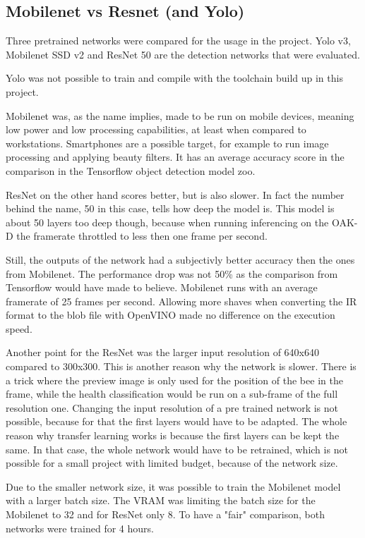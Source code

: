 \documentclass[a4paper,titlepage]{article}
\begin{document}
\subsection{Mobilenet vs Resnet (and Yolo)}

Three pretrained networks were compared for the usage in the project.
Yolo v3, Mobilenet SSD v2 and ResNet 50 are the detection networks that were evaluated.

Yolo was not possible to train and compile with the toolchain build up in this project.

Mobilenet was, as the name implies, made to be run on mobile devices, meaning low power and low processing capabilities, at least when compared to workstations.
Smartphones are a possible target, for example to run image processing and applying beauty filters.
It has an average accuracy score in the comparison in the Tensorflow object detection model zoo.

ResNet on the other hand scores better, but is also slower.
In fact the number behind the name, 50 in this case, tells how deep the model is.
This model is about 50 layers too deep though, because when running inferencing on the OAK-D the framerate throttled to less then one frame per second.

Still, the outputs of the network had a subjectivly better accuracy then the ones from Mobilenet.
The performance drop was not 50\% as the comparison from Tensorflow would have made to believe.
Mobilenet runs with an average framerate of 25 frames per second.
Allowing more shaves when converting the IR format to the blob file with OpenVINO made no difference on the execution speed.

Another point for the ResNet was the larger input resolution of 640x640 compared to 300x300.
This is another reason why the network is slower.
There is a trick where the preview image is only used for the position of the bee in the frame, while the health classification would be run on a sub-frame of the full resolution one.
Changing the input resolution of a pre trained network is not possible, because for that the first layers would have to be adapted.
The whole reason why transfer learning works is because the first layers can be kept the same.
In that case, the whole network would have to be retrained, which is not possible for a small project with limited budget, because of the network size.

Due to the smaller network size, it was possible to train the Mobilenet model with a larger batch size.
The VRAM was limiting the batch size for the Mobilenet to 32 and for ResNet only 8.
To have a "fair" comparison, both networks were trained for 4 hours.
\end{document}
